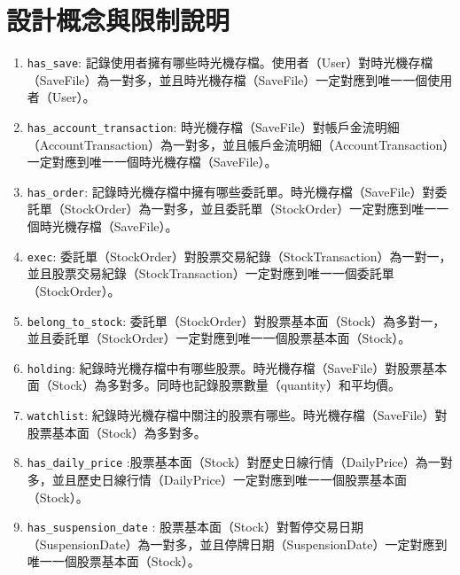 \documentclass[UTF8, a4paper, 12pt, fontset=none]{ctexart}
\begin{document}
{\begin{center}
{
}
\end{center}
}
\section{設計概念與限制說明}
\begin{enumerate}
    \item \texttt{has\_save}: 記錄使用者擁有哪些時光機存檔。使用者（User）對時光機存檔（SaveFile）為一對多，並且時光機存檔（SaveFile）一定對應到唯一一個使用者（User）。
    \item \texttt{has\_account\_transaction}: 時光機存檔（SaveFile）對帳戶金流明細（AccountTransaction）為一對多，並且帳戶金流明細（AccountTransaction）一定對應到唯一一個時光機存檔（SaveFile）。
    \item \texttt{has\_order}: 記錄時光機存檔中擁有哪些委託單。時光機存檔（SaveFile）對委託單（StockOrder）為一對多，並且委託單（StockOrder）一定對應到唯一一個時光機存檔（SaveFile）。
    \item \texttt{exec}: 委託單（StockOrder）對股票交易紀錄（StockTransaction）為一對一，並且股票交易紀錄（StockTransaction）一定對應到唯一一個委託單（StockOrder）。
    \item \texttt{belong\_to\_stock}: 委託單（StockOrder）對股票基本面（Stock）為多對一，並且委託單（StockOrder）一定對應到唯一一個股票基本面（Stock）。
    \item \texttt{holding}: 紀錄時光機存檔中有哪些股票。時光機存檔（SaveFile）對股票基本面（Stock）為多對多。同時也記錄股票數量（quantity）和平均價。
    \item \texttt{watchlist}: 紀錄時光機存檔中關注的股票有哪些。時光機存檔（SaveFile）對股票基本面（Stock）為多對多。
    \item \texttt{has\_daily\_price} :股票基本面（Stock）對歷史日線行情（DailyPrice）為一對多，並且歷史日線行情（DailyPrice）一定對應到唯一一個股票基本面（Stock）。
    \item \texttt{has\_suspension\_date} : 股票基本面（Stock）對暫停交易日期（SuspensionDate）為一對多，並且停牌日期（SuspensionDate）一定對應到唯一一個股票基本面（Stock）。
\end{enumerate} 
\end{document}
